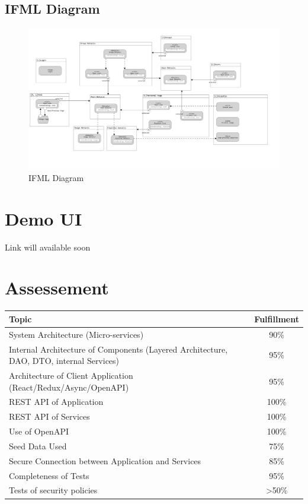 \documentclass[acmart, nonacm]{acmart}
\begin{document}
\subsection{IFML Diagram}
\begin{figure}[h]
    \includegraphics[width=\textwidth]{../IFML Diagram/IFMLDiagram}
    \caption{IFML Diagram}
\end{figure}


\section{Demo UI}
Link will available soon

\section{Assessement}

    \begin{table}[ht]
    \centering
    \begin{tabular}{|l|c|}
    \hline
    \textbf{Topic} & \textbf{Fulfillment} \\
    \hline
    System Architecture (Micro-services) & 90\% \\
    Internal Architecture of Components (Layered Architecture, DAO, DTO, internal Services) & 95\% \\
    Architecture of Client Application (React/Redux/Async/OpenAPI) & 95\% \\
    REST API of Application & 100\% \\
    REST API of Services & 100\% \\
    Use of OpenAPI & 100\% \\
    Seed Data Used & 75\% \\
    Secure Connection between Application and Services & 85\% \\
    Completeness of Tests & 95\% \\
    Tests of security policies & >50\% \\
    \hline
    \end{tabular}
    \end{table}
\end{document}
